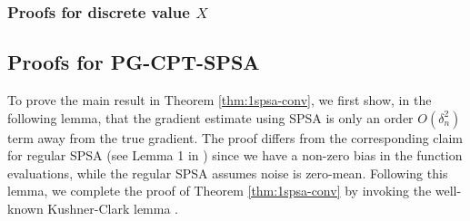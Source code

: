 \subsubsection{Proofs for discrete value $X$}
\label{sec:proofs-discrete}


\subsection{Proofs for PG-CPT-SPSA}
\label{appendix:1spsa}

To prove the main result in Theorem \ref{thm:1spsa-conv}, we first show, in the following lemma, that the gradient estimate using SPSA is only an order $O(\delta_n^2)$ term away from the true gradient. The proof differs from the corresponding claim for regular SPSA (see Lemma 1 in \cite{spall}) since we have a non-zero bias in the function evaluations, while the regular SPSA assumes noise is zero-mean. Following this lemma, we complete the proof of Theorem \ref{thm:1spsa-conv} by invoking the well-known Kushner-Clark lemma \cite{kushner-clark}.

